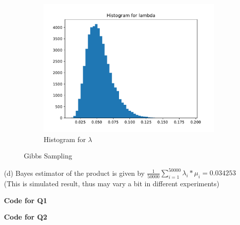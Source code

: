 \documentclass{homeworg}
\begin{document}
\begin{figure}[h]
\begin{subfigure}[b]{0.48\textwidth}
	\includegraphics[width=\textwidth]{q2_partc_hist_lambda.pdf}
	\caption{Histogram for $\lambda$}
\end{subfigure}
	\caption{Gibbs Sampling}
\end{figure}

(d) Bayes estimator of the product is given by $\frac{1}{50000}\sum_{i=1}^{50000}\lambda_i*\mu_i=0.034253$ (This is simulated result, thus may vary a bit in different experiments)
%
%

\newpage
\textbf{Code for Q1}


\newpage
\textbf{Code for Q2}

%
\end{document}
